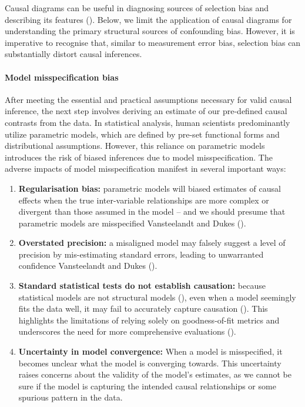 \documentclass[
  singlecolumn,
  9pt]{article}
\let\oldparagraph\paragraph
\renewcommand{\paragraph}[1]{\oldparagraph{#1}\mbox{}}
\begin{document}
Causal diagrams can be useful in diagnosing sources of selection bias
and describing its features ().
Below, we limit the application of causal diagrams for understanding the
primary structural sources of confounding bias. However, it is
imperative to recognise that, similar to measurement error bias,
selection bias can substantially distort causal inferences.

\paragraph{Model misspecification
bias}\label{model-misspecification-bias}

After meeting the essential and practical assumptions necessary for
valid causal inference, the next step involves deriving an estimate of
our pre-defined causal contrasts from the data. In statistical analysis,
human scientists predominantly utilize parametric models, which are
defined by pre-set functional forms and distributional assumptions.
However, this reliance on parametric models introduces the risk of
biased inferences due to model misspecification. The adverse impacts of
model misspecification manifest in several important ways:

\begin{enumerate}
\def\labelenumi{\arabic{enumi}.}
\item
  \textbf{Regularisation bias:} parametric models will biased estimates
  of causal effects when the true inter-variable relationships are more
  complex or divergent than those assumed in the model -- and we should
  presume that parametric models are misspecified Vansteelandt and Dukes
  ().
\item
  \textbf{Overstated precision:} a misaligned model may falsely suggest
  a level of precision by mis-estimating standard errors, leading to
  unwarranted confidence Vansteelandt and Dukes
  ().
\item
  \textbf{Standard statistical tests do not establish causation:}
  because statistical models are not structural models
  (), even when a
  model seemingly fits the data well, it may fail to accurately capture
  causation (). This
  highlights the limitations of relying solely on goodness-of-fit
  metrics and underscores the need for more comprehensive evaluations
  ().
\item
  \textbf{Uncertainty in model convergence:} When a model is
  misspecified, it becomes unclear what the model is converging towards.
  This uncertainty raises concerns about the validity of the model's
  estimates, as we cannot be sure if the model is capturing the intended
  causal relationships or some spurious pattern in the data.
\end{enumerate}
\end{document}
